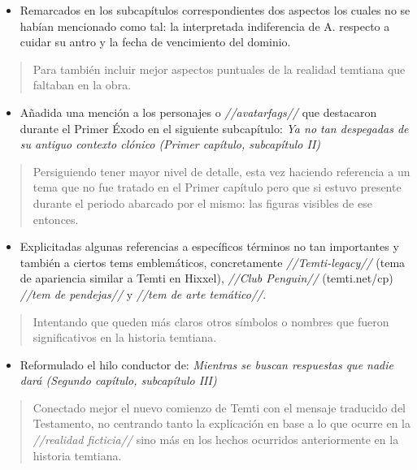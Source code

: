 \documentclass[
  spanish,
]{book}
\providecommand{\tightlist}{%
  \setlength{\itemsep}{0pt}\setlength{\parskip}{0pt}}
\begin{document}
\begin{itemize}
\tightlist
\item
  Remarcados en los subcapítulos correspondientes dos aspectos los cuales no se habían mencionado como tal: la interpretada indiferencia de A. respecto a cuidar su antro y la fecha de vencimiento del dominio.
\end{itemize}

\begin{quote}
Para también incluir mejor aspectos puntuales de la realidad temtiana que faltaban en la obra.
\end{quote}

\begin{itemize}
\tightlist
\item
  Añadida una mención a los personajes o \emph{//avatarfags//} que destacaron durante el Primer Éxodo en el siguiente subcapítulo: \emph{Ya no tan despegadas de su antiguo contexto clónico (Primer capítulo, subcapítulo II)}
\end{itemize}

\begin{quote}
Persiguiendo tener mayor nivel de detalle, esta vez haciendo referencia a un tema que no fue tratado en el Primer capítulo pero que si estuvo presente durante el periodo abarcado por el mismo: las figuras visibles de ese entonces.
\end{quote}

\begin{itemize}
\tightlist
\item
  Explicitadas algunas referencias a específicos términos no tan importantes y también a ciertos tems emblemáticos, concretamente \emph{//Temti-legacy//} (tema de apariencia similar a Temti en Hixxel), \emph{//Club Penguin//} (temti.net/cp) \emph{//tem de pendejas//} y \emph{//tem de arte temático//}.
\end{itemize}

\begin{quote}
Intentando que queden más claros otros símbolos o nombres que fueron significativos en la historia temtiana.
\end{quote}

\begin{itemize}
\tightlist
\item
  Reformulado el hilo conductor de: \emph{Mientras se buscan respuestas que nadie dará (Segundo capítulo, subcapítulo III)}
\end{itemize}

\begin{quote}
Conectado mejor el nuevo comienzo de Temti con el mensaje traducido del Testamento, no centrando tanto la explicación en base a lo que ocurre en la \emph{//realidad ficticia//} sino más en los hechos ocurridos anteriormente en la historia temtiana.
\end{quote}
\end{document}

